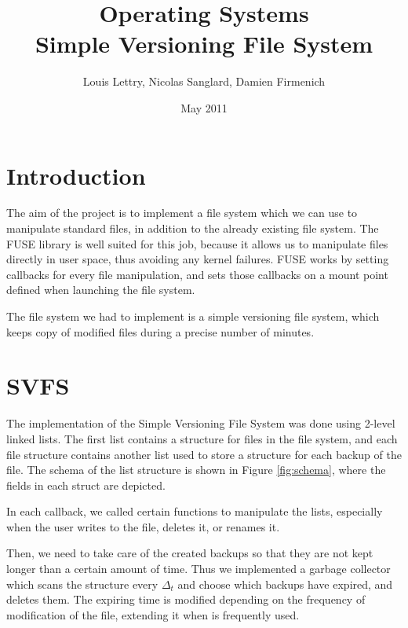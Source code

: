 \documentclass[a4paper]{article}
\title{Operating Systems\\Simple Versioning File System}
\author{Louis Lettry, Nicolas Sanglard, Damien Firmenich}
\date{May 2011}
\begin{document}
\maketitle

\section{Introduction}
The aim of the project is to implement a file system which we can use to manipulate standard files, in addition to the already existing file system. The FUSE library is well suited for this job, because it allows us to manipulate files directly in user space, thus avoiding any kernel failures. FUSE works by setting callbacks for every file manipulation, and sets those callbacks on a mount point defined when launching the file system.

The file system we had to implement is a simple versioning file system, which keeps copy of modified files during a precise number of minutes.

\section{SVFS}
The implementation of the Simple Versioning File System was done using 2-level linked lists. The first list contains a structure for files in the file system, and each file structure contains another list used to store a structure for each backup of the file. The schema of the list structure is shown in Figure \ref{fig:schema}, where the fields in each struct are depicted.

In each callback, we called certain functions to manipulate the lists, especially when the user writes to the file, deletes it, or renames it.

Then, we need to take care of the created backups so that they are not kept longer than a certain amount of time. Thus we implemented a garbage collector which scans the structure every $\Delta_t$ and choose which backups have expired, and deletes them. The expiring time is modified depending on the frequency of modification of the file, extending it when is frequently used.
\end{document}
